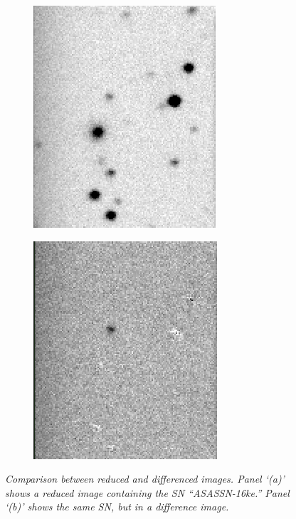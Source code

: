 \documentclass[aps,prb,twocolumn,superscriptaddress]{revtex4-1}
\begin{document}
\begin{figure}
  \centering
  \begin{subfigure}{.5\textwidth}
    \centering
    \includegraphics[width=0.5\linewidth]{figures/compare/red_ASASSN-16ke.png}
    \caption{\it \small{ }}
    \label{fig:red16ke}
  \end{subfigure}%
  \begin{subfigure}{.5\textwidth}
    \centering
      \includegraphics[width=0.5\linewidth]{figures/compare/diff_ASASSN-16ke.png}
    \caption{\it \small{ }}
    \label{fig:diff16ke}
  \end{subfigure}
  \caption{\it \small{Comparison between reduced and differenced images.  Panel `(a)' shows a reduced image containing the SN ``ASASSN-16ke.''  Panel `(b)' shows the same SN, but in a difference image.}}
  \label{fig:compreddiff}
\end{figure}
\end{document}
